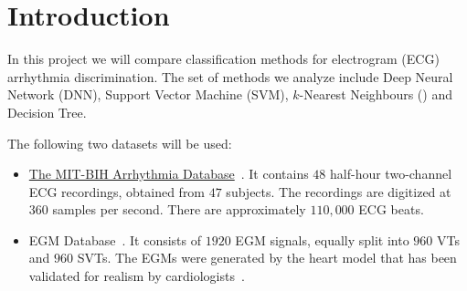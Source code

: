 \section{Introduction}
\label{sec:intro}
In this project we will compare classification methods for 
electrogram (ECG) arrhythmia discrimination. The set of methods we 
analyze include Deep Neural Network (DNN), Support Vector Machine 
(SVM), $k$-Nearest Neighbours (\knn) and Decision Tree.

The following two datasets will be used: 
\begin{itemize}
	\item \href{https://physionet.org/physiobank/database/mitdb/}{The 
	MIT-BIH Arrhythmia Database}~\cite{moody2001impact}. 
	It contains $48$ half-hour two-channel ECG recordings, obtained 
	from $47$ subjects. The 
	recordings are digitized at $360$ samples per second. 
	There are approximately $110,000$ ECG
	beats. 
	\item EGM Database~\cite{jiang2016silico}. 
	It consists
	of $1920$ EGM signals, equally split into $960$ VTs and
	$960$ SVTs. The EGMs were generated by the heart
	model that has been validated for realism by 
	cardiologists~\cite{jiang2016silico}.
\end{itemize}
